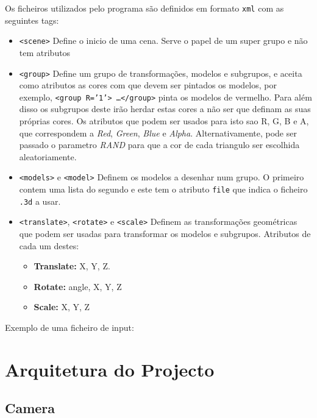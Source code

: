 \documentclass[a4paper]{article}
\begin{document}
Os ficheiros utilizados pelo programa são definidos em formato \texttt{xml} com as seguintes tags:
\begin{itemize}
    \item \texttt{<scene>} Define o inicio de uma cena. Serve o papel de um
        super grupo e não tem atributos
    \item \texttt{<group>} Define um grupo de transformações, modelos e
        subgrupos, e aceita como atributos as cores com que devem ser pintados
        os modelos, por exemplo,
        \texttt{<group R='1'> \ldots </group>} pinta os modelos de vermelho.
        Para além disso os subgrupos deste irão herdar estas cores a não ser
        que definam as suas próprias cores. Os atributos que podem ser usados
        para isto sao R, G, B e A, que correspondem a \textit{Red},
        \textit{Green}, \textit{Blue} e \textit{Alpha}. Alternativamente, pode ser passado
        o parametro \textit{RAND} para que a cor de cada triangulo ser
        escolhida aleatoriamente.
    \item \texttt{<models>} e \texttt{<model>} Definem os modelos a desenhar
        num grupo. O primeiro contem uma lista do segundo e este tem o atributo
        \texttt{file} que indica o ficheiro \texttt{.3d} a usar.
    \item \texttt{<translate>}, \texttt{<rotate>} e \texttt{<scale>} Definem as
        transformações geométricas que podem ser usadas para transformar os
        modelos e subgrupos. Atributos de cada um destes:
        \begin{itemize}
            \item \textbf{Translate:} X, Y, Z.
            \item \textbf{Rotate:} angle, X, Y, Z
            \item \textbf{Scale:} X, Y, Z
        \end{itemize}
\end{itemize}

Exemplo de uma ficheiro de input:


\pagebreak

\section{Arquitetura do Projecto}

\subsection{Camera}
\end{document}
